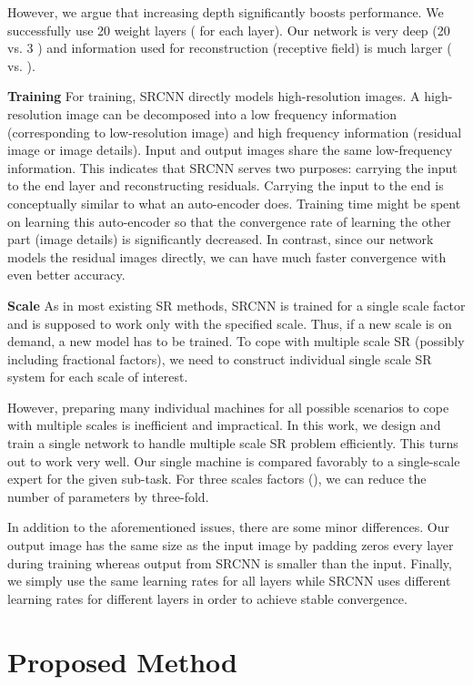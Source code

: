 \documentclass[10pt,twocolumn,letterpaper]{article}
\begin{document}
However, we argue that increasing depth significantly boosts performance. We successfully use 20 weight layers ( for each layer). Our network is very deep (20 vs. 3 \cite{dong2015image}) and information used for reconstruction (receptive field) is much larger ( vs. ).

\textbf{Training}
For training, SRCNN directly models high-resolution images. A high-resolution image can be decomposed into a low frequency information (corresponding to low-resolution image) and high frequency information (residual image or image details). Input and output images share the same low-frequency information. This indicates that SRCNN  serves two purposes: carrying the input to the end layer and reconstructing residuals. Carrying the input to the end is conceptually similar to what an auto-encoder does. Training time might be spent on learning this auto-encoder so that the convergence rate of learning the other part (image details) is significantly decreased. In contrast, since our network models the residual images directly, we can have much faster convergence with even better accuracy.

\textbf{Scale} As in most existing SR methods, SRCNN is trained for a single scale factor and is supposed to work only with the specified scale. Thus, if a new scale is on demand, a new model has to be trained. To cope with multiple scale SR (possibly including fractional factors), we need to construct individual single scale SR system for each scale of interest.

However, preparing many individual machines for all possible scenarios to cope with multiple scales is inefficient and impractical.
In this work, we design and train a single network to handle multiple scale SR problem efficiently. This turns out to work very well. Our single machine is compared favorably to a single-scale expert for the given sub-task. For three scales factors (), we can reduce the number of parameters by three-fold.


In addition to the aforementioned issues, there are some minor differences. Our output image has the same size as the input image by padding zeros every layer during training whereas output from SRCNN is smaller than the input. Finally, we simply use the same learning rates for all layers while SRCNN uses different learning rates for different layers in order to achieve stable convergence.

\section{Proposed Method}
\end{document}
